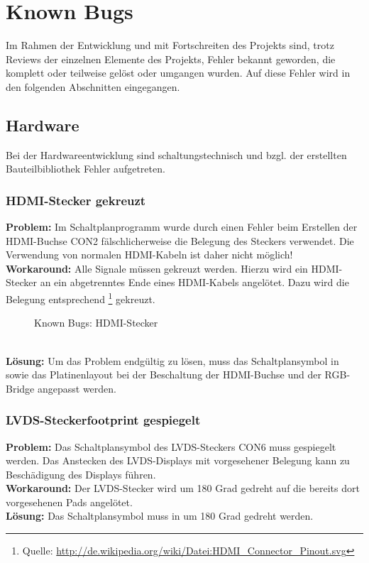 \section{Known Bugs}
Im Rahmen der Entwicklung und mit Fortschreiten des Projekts sind, trotz Reviews der einzelnen Elemente des Projekts, Fehler bekannt geworden, die komplett oder teilweise gelöst oder umgangen wurden. Auf diese Fehler wird in den folgenden Abschnitten eingegangen.
\subsection{Hardware}
Bei der Hardwareentwicklung sind schaltungstechnisch und bzgl. der erstellten Bauteilbibliothek Fehler aufgetreten. 
\subsubsection{HDMI-Stecker gekreuzt}
\textbf{Problem:} Im Schaltplanprogramm  wurde durch einen Fehler beim Erstellen der HDMI-Buchse CON2 fälschlicherweise die Belegung des Steckers verwendet. Die Verwendung von normalen HDMI-Kabeln ist daher nicht möglich!\\
\textbf{Workaround:} Alle Signale müssen gekreuzt werden. Hierzu wird ein HDMI-Stecker an ein abgetrenntes Ende eines HDMI-Kabels angelötet. Dazu wird die Belegung entsprechend \footnote{Quelle: \url{http://de.wikipedia.org/wiki/Datei:HDMI_Connector_Pinout.svg}} gekreuzt.
\begin{figure}[htp]
	\center
    \caption{Known Bugs: HDMI-Stecker}
    \label{fig:hdmi_stecker_problem}
\end{figure}\\
\textbf{Lösung:} Um das Problem endgültig zu lösen, muss das Schaltplansymbol in \\sowie das Platinenlayout bei der Beschaltung der HDMI-Buchse und der RGB-Bridge angepasst werden.
\subsubsection{LVDS-Steckerfootprint gespiegelt}
\textbf{Problem:} Das Schaltplansymbol des LVDS-Steckers CON6 muss gespiegelt werden. Das Anstecken des LVDS-Displays mit vorgesehener Belegung kann zu Beschädigung des Displays führen.\\
\textbf{Workaround:} Der LVDS-Stecker wird um 180 Grad gedreht auf die bereits dort vorgesehenen Pads angelötet.\\
\textbf{Lösung:} Das Schaltplansymbol muss in  um 180 Grad gedreht werden.
